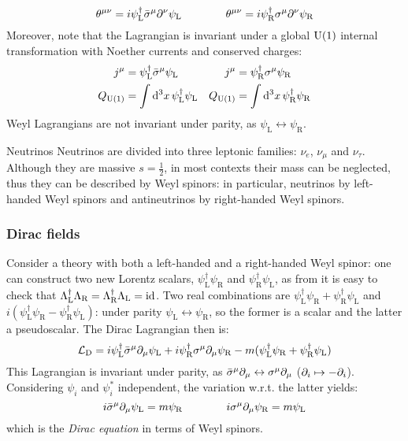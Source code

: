 \begin{equation}
  \theta^{\mu \nu} = i \psi_\text{L}^\dagger \bar{\sigma}^\mu \partial^\nu \psi_\text{L}
  \qquad \qquad
  \theta^{\mu \nu} = i \psi_\text{R}^\dagger \sigma^\mu \partial^\nu \psi_\text{R}
\end{equation}
Moreover, note that the Lagrangian is invariant under a global $ \mathrm{U}(1) $ internal transformation with Noether currents and conserved charges:
\begin{align*}
  j^\mu &= \psi_\text{L}^\dagger \bar{\sigma}^\mu \psi_\text{L} & j^\mu &= \psi_\text{R}^\dagger \sigma^\mu \psi_\text{R} \\
  Q_{\mathrm{U}(1)} &= \int \mathrm{d}^3x\, \psi_\text{L}^\dagger \psi_\text{L} & Q_{\mathrm{U}(1)} &= \int \mathrm{d}^3x\, \psi_\text{R}^\dagger \psi_\text{R}
\end{align*}
Weyl Lagrangians are not invariant under parity, as $ \psi_\text{L} \leftrightarrow \psi_\text{R} $.

\begin{example}{Neutrinos}{}
  Neutrinos are divided into three leptonic families: $ \nu_e $, $ \nu_\mu $ and $ \nu_\tau $. Although they are massive $ s = \frac{1}{2} $, in most contexts their mass can be neglected, thus they can be described by Weyl spinors: in particular, neutrinos by left-handed Weyl spinors and antineutrinos by right-handed Weyl spinors.
\end{example}

\subsubsection{Dirac fields}

Consider a theory with both a left-handed and a right-handed Weyl spinor: one can construct two new Lorentz scalars, $ \psi_\text{L}^\dagger \psi_\text{R} $ and $ \psi_\text{R}^\dagger \psi_\text{L} $, as from  it is easy to check that $ \Lambda_\text{L}^\dagger \Lambda_\text{R} = \Lambda_\text{R}^\dagger \Lambda_\text{L} = \operatorname{id} $. Two real combinations are $ \psi_\text{L}^\dagger \psi_\text{R} + \psi_\text{R}^\dagger \psi_\text{L} $ and $ i (\psi_\text{L}^\dagger \psi_\text{R} - \psi_\text{R}^\dagger \psi_\text{L}) $: under parity $ \psi_\text{L} \leftrightarrow \psi_\text{R} $, so the former is a scalar and the latter a pseudoscalar. The Dirac Lagrangian then is:
\begin{equation}
  \mathcal{L}_\text{D} = i \psi_\text{L}^\dagger \bar{\sigma}^\mu \partial_\mu \psi_\text{L} + i \psi_\text{R}^\dagger \sigma^\mu \partial_\mu \psi_\text{R} - m ( \psi_\text{L}^\dagger \psi_\text{R} + \psi_\text{R}^\dagger \psi_\text{L} )
\end{equation}
This Lagrangian is invariant under parity, as $ \bar{\sigma}^\mu \partial_\mu \leftrightarrow \sigma^\mu \partial_\mu $ ($ \partial_i \mapsto - \partial_i $). Considering $ \psi_i $ and $ \psi_i^* $ independent, the variation w.r.t. the latter yields:
\begin{equation}
  i \bar{\sigma}^\mu \partial_\mu \psi_\text{L} = m \psi_\text{R}
  \qquad \qquad
  i \sigma^\mu \partial_\mu \psi_\text{R} = m \psi_\text{L}
\end{equation}
which is the \textit{Dirac equation} in terms of Weyl spinors.

